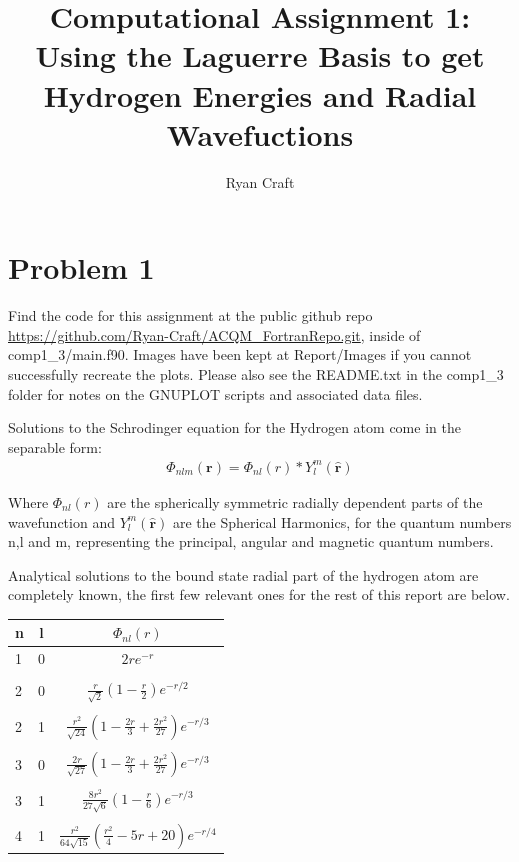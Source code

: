 \documentclass{article}
\renewcommand{\vec}[1]{\mathbf{#1}}
\let\oldhat\hat
\renewcommand{\hat}[1]{\oldhat{\mathbf{#1}}}
\begin{document}
\noindent
	\title{Computational Assignment 1: Using the Laguerre Basis to get Hydrogen Energies and Radial Wavefuctions}
	\author{Ryan Craft}
    \maketitle 
    
    \section{Problem 1}
    Find the code for this assignment at the public github repo \url{https://github.com/Ryan-Craft/ACQM_FortranRepo.git}, inside of comp1\_3/main.f90. 
    Images have been kept at Report/Images if you cannot successfully recreate the plots. Please also see the README.txt in the comp1\_3 folder for notes on the GNUPLOT scripts and associated data files. 
    \label{problem 1}
    
    Solutions to the Schrodinger equation for the Hydrogen atom come in the separable form:
    \begin{gather}
    	\Phi_{nlm}(\vec{r}) =  \Phi_{nl}(r)*Y_{l}^m(\hat{\vec{r}})
    \end{gather}
    
    Where $\Phi_{nl}(r)$ are the spherically symmetric radially dependent parts of the wavefunction and $Y_{l}^m(\hat{\vec{r}})$ are the Spherical Harmonics, for the quantum numbers n,l and m, representing the principal, angular and magnetic quantum numbers. 
    
    Analytical solutions to the bound state radial part of the hydrogen atom are completely known, the first few relevant ones for the rest of this report are below.
    \large
    \begin{center}
    	\begin{tabular}{lcc}\toprule
    		n & l & $\Phi_{nl}(r)$ \\ \bottomrule
    		1 & 0  &   $2re^{-r}$          \\
    		&&\\
    		2 & 0  & $\frac{r}{\sqrt{2}}(1-\frac{r}{2})e^{-r/2} $  \\
    		&&\\
    		2 & 1  & $ \frac{r^2}{\sqrt{24}}(1-\frac{2r}{3} + \frac{2r^2}{27})e^{-r/3}  $  \\
    		&&\\
    		3 & 0  & $\frac{2r}{\sqrt{27}}(1-\frac{2r}{3}+\frac{2r^2}{27})e^{-r/3}$   \\
    		&&\\
    		3 & 1  & $\frac{8r^2}{27\sqrt{6}}(1-\frac{r}{6})e^{-r/3}$ \\ 
    		&&\\
    		4 & 1  & $\frac{r^2}{64\sqrt{15}}(\frac{r^2}{4}-5r+20)e^{-r/4}$ \\ \bottomrule
    	\end{tabular}
    \end{center}
    \normalsize
    
\end{document}
